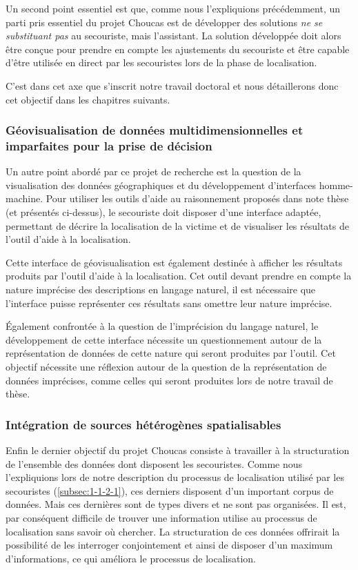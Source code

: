 Un second point essentiel est que, comme nous l'expliquions
précédemment, un parti pris essentiel du projet Choucas est de
développer des solutions \emph{ne se substituant pas} au secouriste,
mais l’assistant. La solution développée doit alors être conçue pour
prendre en compte les ajustements du secouriste et être capable d'être
utilisée en direct par les secouristes lors de la phase de
localisation.

C'est dans cet axe que s'inscrit notre travail doctoral et nous
détaillerons donc cet objectif dans les chapitres suivants.

\subsubsection{Géovisualisation de données multidimensionnelles et
  imparfaites pour la prise de décision}
\label{subsec:1-2-3-3}

Un autre point abordé par ce projet de recherche est la question de la
visualisation des données géographiques et du développement
d'interfaces homme-machine. Pour utiliser les outils d'aide au
raisonnement proposés dans note thèse (et présentés ci-dessus), le
secouriste doit disposer d'une interface adaptée, permettant de
décrire la localisation de la victime et de visualiser les résultats
de l'outil d'aide à la localisation. 

Cette interface de géovisualisation est également destinée à afficher
les résultats produits par l'outil d'aide à la localisation. Cet outil
devant prendre en compte la nature imprécise des descriptions en
langage naturel, il est nécessaire que l'interface puisse représenter
ces résultats sans omettre leur nature imprécise.  

Également confrontée à la question de l'imprécision du langage
naturel, le développement de cette interface nécessite un
questionnement autour de la représentation de données de cette nature
qui seront produites par l'outil. Cet objectif nécessite une réflexion
autour de la question de la représentation de données imprécises,
comme celles qui seront produites lors de notre travail de thèse.

\subsubsection{Intégration de sources hétérogènes spatialisables}
\label{subsec:1-2-3-4}

Enfin le dernier objectif du projet Choucas consiste à travailler à la
structuration de l'ensemble des données dont disposent les
secouristes. Comme nous l'expliquions lors de notre description du
processus de localisation utilisé par les secouristes
(\ref{subsec:1-1-2-1}), ces derniers disposent d'un important corpus
de données. Mais ces dernières sont de types divers et ne sont pas
organisées. Il est, par conséquent difficile de trouver une
information utilise au processus de localisation sans savoir où
chercher. La structuration de ces données offrirait la possibilité de
les interroger conjointement et ainsi de disposer d'un maximum
d'informations, ce qui améliora le processus de localisation.

